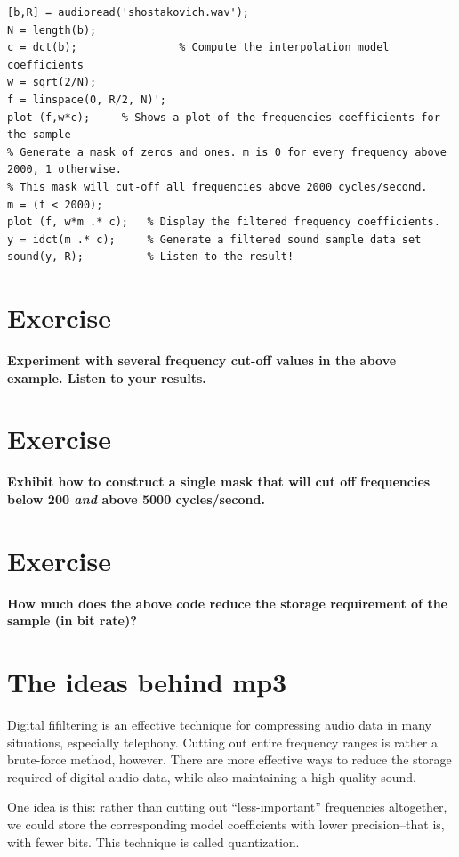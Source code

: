 \documentclass[10pt]{article}
\begin{document}
\begin{verbatim}
[b,R] = audioread('shostakovich.wav');
N = length(b);
c = dct(b);                % Compute the interpolation model coefficients
w = sqrt(2/N);
f = linspace(0, R/2, N)';
plot (f,w*c);     % Shows a plot of the frequencies coefficients for the sample
% Generate a mask of zeros and ones. m is 0 for every frequency above 2000, 1 otherwise.
% This mask will cut-off all frequencies above 2000 cycles/second.
m = (f < 2000);
plot (f, w*m .* c);   % Display the filtered frequency coefficients.
y = idct(m .* c);     % Generate a filtered sound sample data set
sound(y, R);          % Listen to the result!
\end{verbatim}

\section*{Exercise}
{\bf Experiment with several frequency cut-off values in the above example.
Listen to your results. }

\section*{Exercise}
{\bf Exhibit how to construct a single mask that will
cut off frequencies below 200 {\it and} above 5000 cycles/second. }

\section*{Exercise}
{\bf How much does the above code reduce the storage requirement of the sample
(in bit rate)?}

\section*{The ideas behind mp3}
Digital ﬁfiltering is an effective technique for compressing audio
data in many situations, especially telephony. Cutting out entire
frequency ranges is rather a brute-force method, however. There are
more effective ways to reduce the storage required of digital audio
data, while also maintaining a high-quality sound.

One idea is this: rather than cutting out ``less-important'' 
frequencies altogether, we could store the corresponding model 
coefficients with lower precision--that is, with fewer bits. 
This technique is called quantization.
\end{document}
